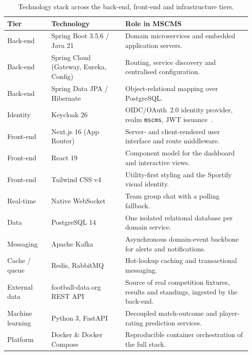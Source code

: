 \begin{table}[htbp]
\centering
\caption{Technology stack across the back-end, front-end and infrastructure tiers.}
\label{tab:stack}
\renewcommand{\arraystretch}{1.3}
\begin{tabular}{|p{}|p{}|p{}|}
\hline
\textbf{Tier} & \textbf{Technology} & \textbf{Role in MSCMS} \\
\hline
Back-end & Spring Boot 3.5.6 / Java 21~\cite{springboot} & Domain microservices and embedded application servers. \\
\hline
Back-end & Spring Cloud (Gateway, Eureka, Config)~\cite{springcloud} & Routing, service discovery and centralised configuration. \\
\hline
Back-end & Spring Data JPA / Hibernate & Object-relational mapping over PostgreSQL. \\
\hline
Identity & Keycloak 26~\cite{keycloak} & OIDC/OAuth~2.0 identity provider, realm \texttt{mscms}, JWT issuance~\cite{jwt}. \\
\hline
Front-end & Next.js 16 (App Router)~\cite{nextjs} & Server- and client-rendered user interface and route middleware. \\
\hline
Front-end & React 19~\cite{react} & Component model for the dashboard and interactive views. \\
\hline
Front-end & Tailwind CSS v4 & Utility-first styling and the Sportify visual identity. \\
\hline
Real-time & Native WebSocket~\cite{websocket} & Team group chat with a polling fallback. \\
\hline
Data & PostgreSQL 14~\cite{postgres} & One isolated relational database per domain service. \\
\hline
Messaging & Apache Kafka~\cite{kafka} & Asynchronous domain-event backbone for alerts and notifications. \\
\hline
Cache / queue & Redis, RabbitMQ & Hot-lookup caching and transactional messaging. \\
\hline
External data & football-data.org REST API~\cite{footballdata,restapi} & Source of real competition fixtures, results and standings, ingested by the back-end. \\
\hline
Machine learning & Python 3, FastAPI & Decoupled match-outcome and player-rating prediction services. \\
\hline
Platform & Docker \& Docker Compose~\cite{docker} & Reproducible container orchestration of the full stack. \\
\hline
\end{tabular}
\end{table}

